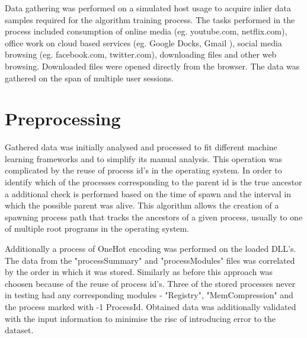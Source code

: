 \documentclass[a4paper,twoside,12pt]{book}
\begin{document}
Data gathering was performed on a simulated host usage to acquire inlier data samples required 
for the algorithm training process. The tasks performed in the process 
included consumption of online media (eg. youtube.com, netflix.com), office work on cloud 
based services (eg. Google Docks, Gmail ), social media browsing (eg. facebook.com, 
twitter.com), downloading files and other web browsing. Downloaded files were opened 
directly from the browser. The data was gathered on the span of multiple user sessions.

\section{Preprocessing}

Gathered data was initially analysed and processed to fit different machine learning 
frameworks and to simplify its manual analysis. This operation was complicated by the 
reuse of process id's in the operating system. In order to identify which of the processes 
corresponding to the parent id is the true ancestor a additional check is performed based 
on the time of spawn and the interval in which the possible parent was alive. This algorithm 
allows the creation of a spawning process path that tracks the ancestors of a given process, 
usually to one of multiple root programs in the operating system. 

Additionally a process of OneHot encoding was performed on the loaded DLL's. The data from 
the "processSummary" and "processModules" files was correlated by the order in which it was 
stored. Similarly as before this approach was choosen because of the reuse of process id's.
Three of the stored processes never in testing had any corresponding modules - 
"Registry", "MemCompression" and the process marked with -1 ProcessId. Obtained data was
additionally validated with the input information to minimise the risc of introducing error
to the dataset.
\end{document}
